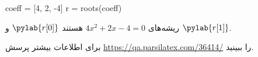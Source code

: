 \documentclass[12pt,a4paper]{report}
\begin{document}
\begin{pylabcode}
coeff = [4, 2, -4]
r = roots(coeff)
\end{pylabcode}
ریشه‌های
 $4x^2 + 2x - 4 = 0$
 هستند
$\pylab{r[0]}$ و $\pylab{r[1]}$.

برای اطلاعات بیشتر پرسش
\url{https://qa.parsilatex.com/36414/}
را ببینید.
\end{document}
